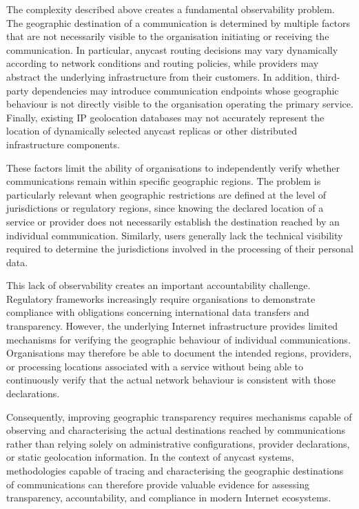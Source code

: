 The complexity described above creates a fundamental observability problem. The geographic destination of a communication is determined by multiple factors that are not necessarily visible to the organisation initiating or receiving the communication. In particular, anycast routing decisions may vary dynamically according to network conditions and routing policies, while providers may abstract the underlying infrastructure from their customers. In addition, third-party dependencies may introduce communication endpoints whose geographic behaviour is not directly visible to the organisation operating the primary service. Finally, existing IP geolocation databases may not accurately represent the location of dynamically selected anycast replicas or other distributed infrastructure components.

These factors limit the ability of organisations to independently verify whether communications remain within specific geographic regions. The problem is particularly relevant when geographic restrictions are defined at the level of jurisdictions or regulatory regions, since knowing the declared location of a service or provider does not necessarily establish the destination reached by an individual communication. Similarly, users generally lack the technical visibility required to determine the jurisdictions involved in the processing of their personal data.

This lack of observability creates an important accountability challenge. Regulatory frameworks increasingly require organisations to demonstrate compliance with obligations concerning international data transfers and transparency. However, the underlying Internet infrastructure provides limited mechanisms for verifying the geographic behaviour of individual communications. Organisations may therefore be able to document the intended regions, providers, or processing locations associated with a service without being able to continuously verify that the actual network behaviour is consistent with those declarations.

Consequently, improving geographic transparency requires mechanisms capable of observing and characterising the actual destinations reached by communications rather than relying solely on administrative configurations, provider declarations, or static geolocation information. In the context of anycast systems, methodologies capable of tracing and characterising the geographic destinations of communications can therefore provide valuable evidence for assessing transparency, accountability, and compliance in modern Internet ecosystems.

